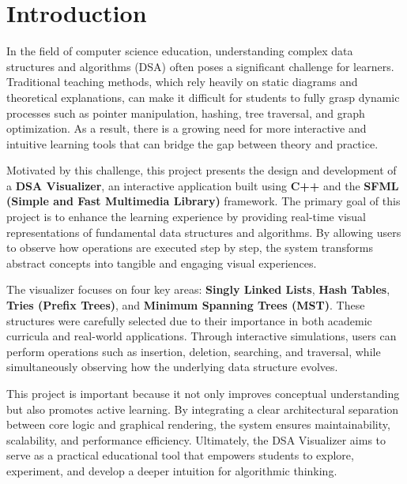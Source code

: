 \section {Introduction}

In the field of computer science education, understanding complex data structures and algorithms (DSA) often poses a significant challenge for learners. Traditional teaching methods, which rely heavily on static diagrams and theoretical explanations, can make it difficult for students to fully grasp dynamic processes such as pointer manipulation, hashing, tree traversal, and graph optimization. As a result, there is a growing need for more interactive and intuitive learning tools that can bridge the gap between theory and practice.

Motivated by this challenge, this project presents the design and development of a \textbf{DSA Visualizer}, an interactive application built using \textbf{C++} and the \textbf{SFML (Simple and Fast Multimedia Library)} framework. The primary goal of this project is to enhance the learning experience by providing real-time visual representations of fundamental data structures and algorithms. By allowing users to observe how operations are executed step by step, the system transforms abstract concepts into tangible and engaging visual experiences.

The visualizer focuses on four key areas: \textbf{Singly Linked Lists}, \textbf{Hash Tables}, \textbf{Tries (Prefix Trees)}, and \textbf{Minimum Spanning Trees (MST)}. These structures were carefully selected due to their importance in both academic curricula and real-world applications. Through interactive simulations, users can perform operations such as insertion, deletion, searching, and traversal, while simultaneously observing how the underlying data structure evolves.

This project is important because it not only improves conceptual understanding but also promotes active learning. By integrating a clear architectural separation between core logic and graphical rendering, the system ensures maintainability, scalability, and performance efficiency. Ultimately, the DSA Visualizer aims to serve as a practical educational tool that empowers students to explore, experiment, and develop a deeper intuition for algorithmic thinking.

\clearpage